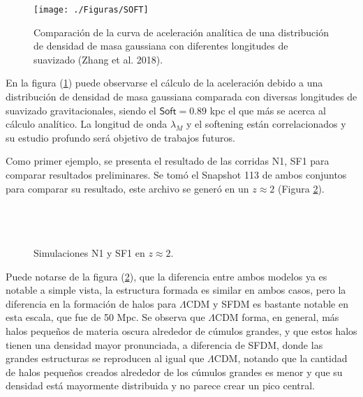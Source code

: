 \documentclass[a4paper,openright,12pt]{book}
\begin{document}
\begin{figure}
\centering
\texttt{[image: ./Figuras/SOFT]}
\caption{\footnotesize{Comparación de la curva de aceleración analítica de una distribución de densidad de masa gaussiana con diferentes longitudes de suavizado (Zhang et al. 2018).}}\label{fig 4.4}
\end{figure}

En la figura (\ref{fig 4.4}) puede observarse el cálculo de la aceleración debido a una distribución de densidad de masa gaussiana comparada con diversas longitudes de suavizado gravitacionales, siendo el $\textsf{Soft}=0.89$ kpc el que más se acerca al cálculo analítico. La longitud de onda $\lambda_{M}$ y el \textsf{softening} están correlacionados y su estudio profundo será objetivo de trabajos futuros.

\begin{figure}
\end{figure}

Como primer ejemplo, se presenta el resultado de las corridas N1, SF1 para comparar resultados preliminares. Se tomó el \textsf{Snapshot 113} de ambos conjuntos para comparar su resultado, este archivo se generó en un $z \approx 2$ (Figura \ref{Fig 4.6}).\\\\\\\

\begin{figure}
\centering
{}
\caption{\footnotesize{Simulaciones N1 y SF1 en $z\approx2$.}}\label{Fig 4.6}
\end{figure}

Puede notarse de la figura (\ref{Fig 4.6}), que la diferencia entre ambos modelos ya es notable a simple vista, la estructura formada es similar en ambos casos, pero la diferencia en la formación de halos para $\Lambda$CDM y SFDM es bastante notable en esta escala, que fue de 50 Mpc. Se observa que $\Lambda$CDM forma, en general, más halos pequeños de materia oscura alrededor de cúmulos grandes, y que estos halos tienen una densidad mayor pronunciada, a diferencia de SFDM, donde las grandes estructuras se reproducen al igual que $\Lambda$CDM, notando que la cantidad de halos pequeños creados alrededor de los cúmulos grandes es menor y que su densidad está mayormente distribuida y no parece crear un pico central.
\end{document}
